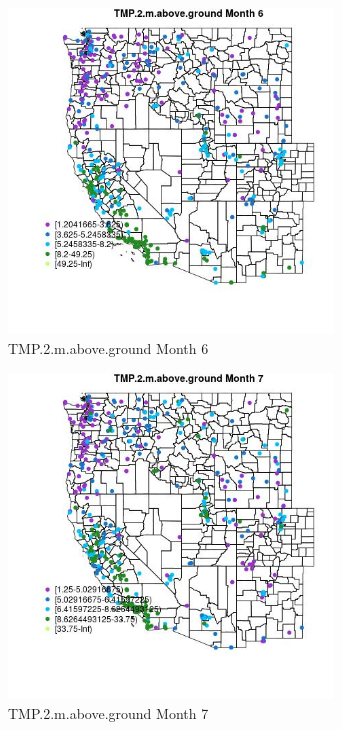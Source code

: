 \begin{figure} 
\centering  
\includegraphics[width=0.77\textwidth]{Code_Outputs/ML_input_report_ML_input_PM25_Step5_part_d_de_duplicated_aves_ML_input_MapObsMo6TMP2maboveground.jpg} 
\caption{\label{fig:ML_input_report_ML_input_PM25_Step5_part_d_de_duplicated_aves_ML_inputMapObsMo6TMP2maboveground}TMP.2.m.above.ground Month 6} 
\end{figure} 
 

\begin{figure} 
\centering  
\includegraphics[width=0.77\textwidth]{Code_Outputs/ML_input_report_ML_input_PM25_Step5_part_d_de_duplicated_aves_ML_input_MapObsMo7TMP2maboveground.jpg} 
\caption{\label{fig:ML_input_report_ML_input_PM25_Step5_part_d_de_duplicated_aves_ML_inputMapObsMo7TMP2maboveground}TMP.2.m.above.ground Month 7} 
\end{figure} 
 

